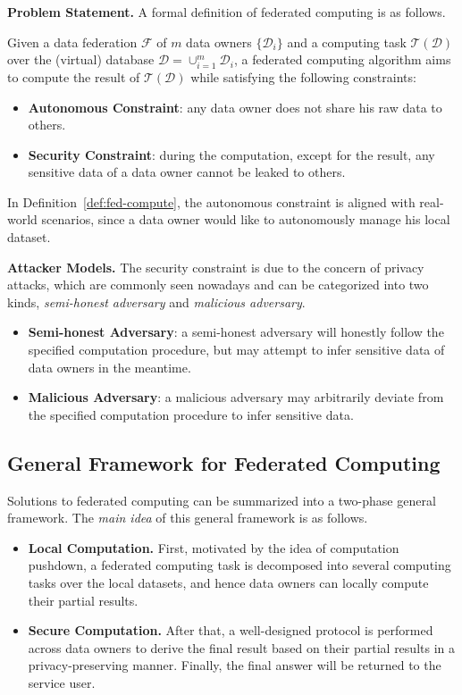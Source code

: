 \documentclass[11pt]{article}
\newcommand\defref[1]{Definition~\ref{#1}}
\newcommand{\fakeparagraph}[1]{\vspace{1mm}\noindent\textbf{#1.}}
\newcommand{\FNew}{\mathcal{F}}
\newcommand{\D}{\mathcal{D}}
\newcommand{\T}{\mathcal{T}}
\begin{document}
\fakeparagraph{Problem Statement} A formal definition of federated computing is as follows.

\begin{definition}\label{def:fed-compute}
	Given a data federation $\FNew$ of $m$ data owners $\{\D_i\}$ and a computing task $\T(\D)$ over the (virtual) database $\D=\cup_{i=1}^{m}{\D_i}$,
	a federated computing algorithm aims to compute the result of $\T(\D)$ while satisfying the following constraints:
	\begin{itemize}
		\item \textbf{Autonomous Constraint}: any data owner does not share his raw data to others.
		\item \textbf{Security Constraint}: during the computation, except for the result, any sensitive data of a data owner cannot be leaked to others.
	\end{itemize}
\end{definition}

In \defref{def:fed-compute}, the autonomous constraint is aligned with real-world scenarios,
since a data owner would like to autonomously manage his local dataset.

\fakeparagraph{Attacker Models}
The security constraint is due to the concern of privacy attacks, which are commonly seen nowadays and can be categorized into two kinds, \textit{semi-honest adversary} and \textit{malicious adversary}.
\begin{itemize}
	\item \textbf{Semi-honest Adversary}: a semi-honest adversary will honestly follow the specified computation procedure,
	but may attempt to infer sensitive data of data owners in the meantime.
	\item \textbf{Malicious Adversary}: a malicious adversary may arbitrarily deviate from the specified computation procedure to infer sensitive data.
\end{itemize}

\subsection{General Framework for Federated Computing}\label{sec:concept-framework}

Solutions to federated computing can be summarized into a two-phase general framework. The \textit{main idea} of this general framework is as follows.
\begin{itemize}
	\item \textbf{Local Computation.} First, motivated by the idea of computation pushdown, a federated computing task is decomposed into several computing tasks over the local datasets, and hence data owners can locally compute their partial results.
	\item \textbf{Secure Computation.} After that, a well-designed protocol is performed across data owners to derive the final result based on their partial results in a privacy-preserving manner. Finally, the final answer will be returned to the service user.
\end{itemize}
\end{document}
